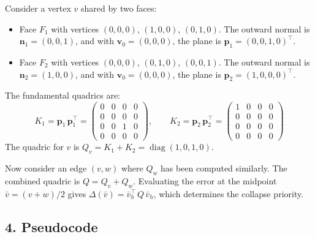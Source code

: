 \begin{example}\label{ex:qem_simple}
Consider a vertex $v$ shared by two faces:
\begin{itemize}
    \item Face $F_1$ with vertices $(0, 0, 0)$, $(1, 0, 0)$, $(0, 1, 0)$. The outward normal is $\mathbf{n}_1 = (0, 0, 1)$, and with $\mathbf{v}_0 = (0,0,0)$, the plane is $\mathbf{p}_1 = (0, 0, 1, 0)^\top$.
    \item Face $F_2$ with vertices $(0, 0, 0)$, $(0, 1, 0)$, $(0, 0, 1)$. The outward normal is $\mathbf{n}_2 = (1, 0, 0)$, and with $\mathbf{v}_0 = (0,0,0)$, the plane is $\mathbf{p}_2 = (1, 0, 0, 0)^\top$.
\end{itemize}
The fundamental quadrics are:
\[
    K_1 = \mathbf{p}_1 \, \mathbf{p}_1^\top = \begin{pmatrix} 0 & 0 & 0 & 0 \\ 0 & 0 & 0 & 0 \\ 0 & 0 & 1 & 0 \\ 0 & 0 & 0 & 0 \end{pmatrix}, \qquad
    K_2 = \mathbf{p}_2 \, \mathbf{p}_2^\top = \begin{pmatrix} 1 & 0 & 0 & 0 \\ 0 & 0 & 0 & 0 \\ 0 & 0 & 0 & 0 \\ 0 & 0 & 0 & 0 \end{pmatrix}
\]
The quadric for $v$ is $Q_v = K_1 + K_2 = \operatorname{diag}(1, 0, 1, 0)$.

Now consider an edge $(v, w)$ where $Q_w$ has been computed similarly. The combined quadric is $Q = Q_v + Q_w$. Evaluating the error at the midpoint $\bar{v} = (v + w)/2$ gives $\Delta(\bar{v}) = \bar{v}_h^\top \, Q \, \bar{v}_h$, which determines the collapse priority.
\end{example}

\subsection{4. Pseudocode}

